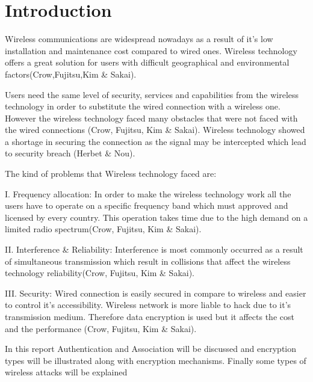 \chapter{Introduction}
\label{chap:intro}

Wireless communications are widespread nowadays as a result of it's low installation and maintenance cost compared to wired ones. Wireless technology offers a great solution for users with difficult geographical and environmental factors(Crow,Fujitsu,Kim \& Sakai).

Users need the same level of security, services and capabilities from the wireless technology in order to substitute the wired connection with a wireless one. However the wireless technology faced many obstacles that were not faced with the wired connections (Crow, Fujitsu, Kim \& Sakai). Wireless technology showed a shortage in securing the connection as the signal may be intercepted which lead to security breach (Herbet \& Nou).

The kind of problems that Wireless technology faced are:

I. Frequency allocation: In order to make the wireless technology work all the users have to operate on a specific frequency band which must approved and licensed by every country. This operation takes time due to the high demand on a limited radio spectrum(Crow, Fujitsu, Kim \& Sakai).

II. Interference \& Reliability: Interference is most commonly occurred as a result of simultaneous transmission which result in collisions that affect the wireless technology reliability(Crow, Fujitsu, Kim \& Sakai).

III. Security: Wired connection is easily secured in compare to wireless and easier to control it's accessibility. Wireless network is more liable to hack due to it's transmission medium. Therefore data encryption is used but it affects the cost and the performance (Crow, Fujitsu, Kim \& Sakai).

In this report Authentication and Association will be discussed and encryption types will be illustrated along with encryption mechanisms. Finally some types of wireless attacks will be explained
